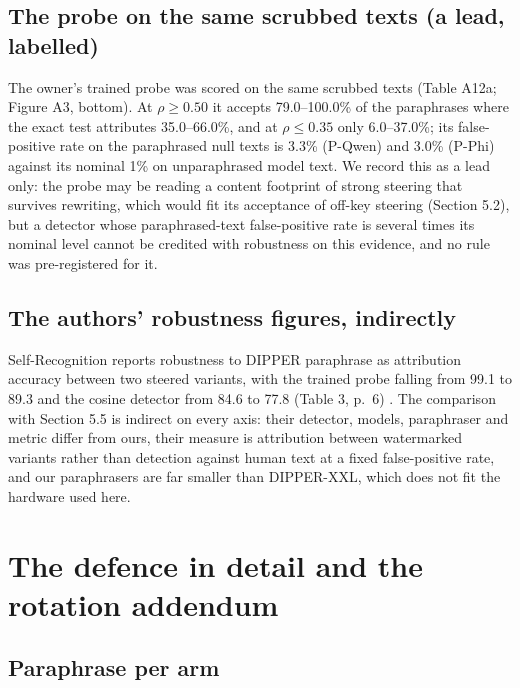 \documentclass[11pt,letterpaper]{article}
\begin{document}
\hypertarget{the-probe-on-the-same-scrubbed-texts-a-lead-labelled}{%
\subsection{The probe on the same scrubbed texts (a lead, labelled)}\label{the-probe-on-the-same-scrubbed-texts-a-lead-labelled}}

The owner's trained probe was scored on the same scrubbed texts (Table A12a; Figure A3, bottom). At \(\rho \geq 0.50\) it accepts 79.0--100.0\% of the paraphrases where the exact test attributes 35.0--66.0\%, and at \(\rho \leq 0.35\) only 6.0--37.0\%; its false-positive rate on the paraphrased null texts is 3.3\% (P-Qwen) and 3.0\% (P-Phi) against its nominal 1\% on unparaphrased model text. We record this as a lead only: the probe may be reading a content footprint of strong steering that survives rewriting, which would fit its acceptance of off-key steering (Section 5.2), but a detector whose paraphrased-text false-positive rate is several times its nominal level cannot be credited with robustness on this evidence, and no rule was pre-registered for it.

\hypertarget{the-authors-robustness-figures-indirectly}{%
\subsection{The authors' robustness figures, indirectly}\label{the-authors-robustness-figures-indirectly}}

Self-Recognition reports robustness to DIPPER paraphrase as attribution accuracy between two steered variants, with the trained probe falling from 99.1 to 89.3 and the cosine detector from 84.6 to 77.8 (Table 3, p.~6) \citep{ardoin2026selfrecognition}. The comparison with Section 5.5 is indirect on every axis: their detector, models, paraphraser and metric differ from ours, their measure is attribution between watermarked variants rather than detection against human text at a fixed false-positive rate, and our paraphrasers are far smaller than DIPPER-XXL, which does not fit the hardware used here.

\hypertarget{the-defence-in-detail-and-the-rotation-addendum}{%
\section{The defence in detail and the rotation addendum}\label{the-defence-in-detail-and-the-rotation-addendum}}

\hypertarget{paraphrase-per-arm}{%
\subsection{Paraphrase per arm}\label{paraphrase-per-arm}}
\end{document}
